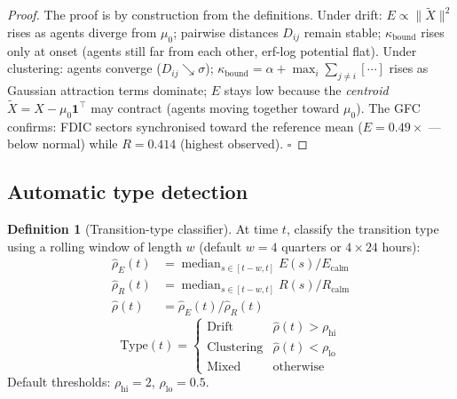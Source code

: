 \documentclass[11pt,a4paper]{article}
\theoremstyle{definition}
\newtheorem{definition}[theorem]{Definition}
\begin{document}
\begin{proof}
The proof is by construction from the definitions.
Under drift: $E \propto \|\tilde X\|^2$ rises as agents diverge from
$\mu_0$; pairwise distances $D_{ij}$ remain stable; $\kappa_\mathrm{bound}$
rises only at onset (agents still far from each other, erf-log potential flat).
Under clustering: agents converge ($D_{ij}\searrow\sigma$);
$\kappa_\mathrm{bound} = \alpha + \max_i\sum_{j\neq i}[\cdots]$ rises
as Gaussian attraction terms dominate;
$E$ stays low because the \emph{centroid} $\tilde X = X - \mu_0\mathbf{1}^\top$
may contract (agents moving together toward $\mu_0$).
The GFC confirms: FDIC sectors synchronised toward the reference mean
($E = 0.49\times$ --- below normal) while $R = 0.414$ (highest observed). $\square$
\end{proof}

\subsection{Automatic type detection}

\begin{definition}[Transition-type classifier]
\label{def:type_classifier}
At time $t$, classify the transition type using a rolling window
of length $w$ (default $w = 4$ quarters or $4\times24$ hours):
\begin{align*}
\hat\rho_E(t) &= \operatorname{median}_{s\in[t-w,t]} E(s) / E_\mathrm{calm} \\
\hat\rho_R(t) &= \operatorname{median}_{s\in[t-w,t]} R(s) / R_\mathrm{calm} \\
\hat\rho(t) &= \hat\rho_E(t) / \hat\rho_R(t)
\end{align*}
\[
\widehat{\mathrm{Type}}(t) = \begin{cases}
\text{Drift}      & \hat\rho(t) > \rho_\mathrm{hi} \\
\text{Clustering} & \hat\rho(t) < \rho_\mathrm{lo} \\
\text{Mixed}      & \text{otherwise}
\end{cases}
\]
Default thresholds: $\rho_\mathrm{hi} = 2$, $\rho_\mathrm{lo} = 0.5$.
\end{definition}
\end{document}
